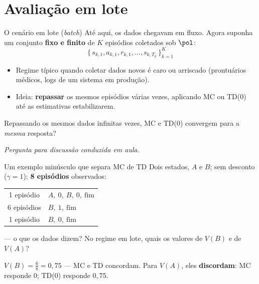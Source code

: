 \documentclass[aspectratio=169, 11pt]{beamer}
\newcommand{\paradiscussao}{\vspace{-0.2em}
  {\footnotesize\color{rlCinza}\itshape Pergunta para discussão conduzida em aula.}}
\begin{document}
\section{Avaliação em lote}

\begin{frame}{O cenário em lote (\emph{batch})}
  Até aqui, os dados chegavam em fluxo. Agora suponha um conjunto
  \textbf{fixo e finito} de $K$ episódios coletados sob $\pol$:
  \vspace{-0.5em}
  \[
    \{\, s_{k,1}, a_{k,1}, r_{k,1}, \ldots, s_{k,T_k} \,\}_{k=1}^{K}
  \]
  \vspace{-1.4em}
  \begin{itemize}\setlength{\itemsep}{0.2ex}
    \item Regime típico quando coletar dados novos é caro ou arriscado
      (prontuários médicos, logs de um sistema em produção).
    \item Ideia: \textbf{repassar} os mesmos episódios várias vezes,
      aplicando MC ou TD(0) até as estimativas estabilizarem.
  \end{itemize}
  \vspace{-0.4em}

  \begin{quizbox}{}
    Repassando os mesmos dados infinitas vezes, MC e TD(0) convergem
    para a \emph{mesma} resposta?
  \end{quizbox}
  \paradiscussao
\end{frame}

\begin{frame}{Um exemplo minúsculo que separa MC de TD}
  Dois estados, $A$ e $B$; sem desconto ($\gamma = 1$); \textbf{8 episódios}
  observados:

  \begin{center}
  \renewcommand{\arraystretch}{1.2}
  \begin{tabular}{cl}
    1 episódio & $A,\ 0,\ B,\ 0,\ \text{fim}$\\
    6 episódios & $B,\ 1,\ \text{fim}$\\
    1 episódio & $B,\ 0,\ \text{fim}$\\
  \end{tabular}
  \end{center}

  \begin{exbox}{— o que os dados dizem?}
    No regime em lote, quais os valores de $V(B)$ e de $V(A)$?
  \end{exbox}

  \pause
  \begin{respbox}
    $V(B) = \tfrac{6}{8} = 0{,}75$ — MC e TD concordam.
    Para $V(A)$, eles \textbf{discordam}: MC responde $0$;
    TD(0) responde $0{,}75$.
  \end{respbox}
\end{frame}
\end{document}
